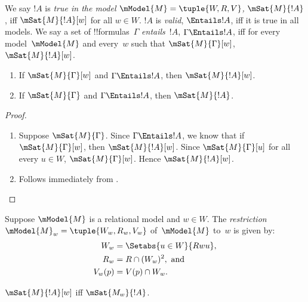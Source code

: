 \documentclass[../../../include/open-logic-section]{subfiles}
\begin{document}

\begin{defn}
  We say $!A$ is \emph{true in the model $\mModel{M} = \tuple{W,R,V}$,} $
  \mSat{M}{!A}$, iff $\mSat{M}{!A}[w]$ for all $w \in W$.
  $!A$ is \emph{valid}, $\Entails !A$, iff it is true in all models.
  We say a set of !!{formula}s~$\Gamma$ \emph{entails}~$!A$, $\Gamma
  \Entails !A$, iff for every model~$\mModel{M}$ and every~$w$ such
  that $\mSat{M}{\Gamma}[w]$, $\mSat{M}{!A}[w]$.
\end{defn}

\begin{prop}
  \begin{enumerate}
  \item{} If $\mSat{M}{\Gamma}[w]$ and
    $\Gamma \Entails !A$, then $\mSat{M}{!A}[w]$.
  \item{} If $\mSat{M}{\Gamma}$ and $\Gamma
    \Entails !A$, then $\mSat{M}{!A}$.
  \end{enumerate}
\end{prop}

\begin{proof}
  \begin{enumerate}
  \item Suppose $\mSat{M}{\Gamma}$. Since $\Gamma \Entails !A$, we
    know that if $\mSat{M}{\Gamma}[w]$, then $\mSat{M}{!A}[w]$. Since
    $\mSat{M}{\Gamma}[u]$ for all every $u \in W$,
    $\mSat{M}{\Gamma}[w]$. Hence $\mSat{M}{!A}[w]$.
  \item Follows immediately from .
  \end{enumerate}
\end{proof}


\begin{defn}
  Suppose $\mModel{M}$ is a relational model and $w \in W$. The
  \emph{restriction} $\mModel{M}_w=\tuple{W_w, R_w, V_w}$
  of~$\mModel{M}$ to~$w$ is given by:
  \begin{align*}
    W_w & = \Setabs{u \in W}{Rwu},\\
    R_w  & = R \cap (W_w)^2, \text{ and}\\
    V_w(p) & = V(p) \cap W_w.
  \end{align*}
\end{defn}

\begin{prop}
  $\mSat{M}{!A}[w]$ iff $\mSat{M_w}{!A}$.
\end{prop}
\end{document}
